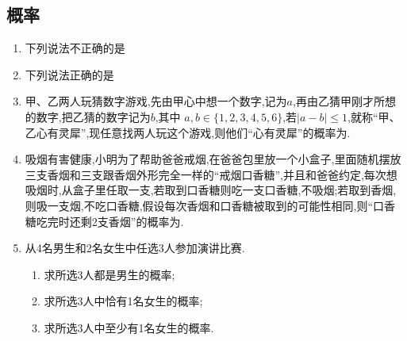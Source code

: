 \subsection*{概率}
\begin{enumerate}
    \item 下列说法不正确的是
    
    \item 下列说法正确的是
    
    \item 甲、乙两人玩猜数字游戏,先由甲心中想一个数字,记为$a$,再由乙猜甲刚才所想的数字,把乙猜的数字记为$b$,其中 $a,b\in\{1,2,3,4,5,6\}$,若$|a-b|\le1$,就称“甲、乙心有灵犀”,现任意找两人玩这个游戏,则他们“心有灵犀”的概率为.
    \item 吸烟有害健康,小明为了帮助爸爸戒烟,在爸爸包里放一个小盒子,里面随机摆放三支香烟和三支跟香烟外形完全一样的“戒烟口香糖”,并且和爸爸约定,每次想吸烟时,从盒子里任取一支,若取到口香糖则吃一支口香糖,不吸烟;若取到香烟,则吸一支烟,不吃口香糖,假设每次香烟和口香糖被取到的可能性相同,则“口香糖吃完时还剩2支香烟”的概率为.
        
    \item 从4名男生和2名女生中任选3人参加演讲比赛.
    \begin{enumerate}
    \item 求所选3人都是男生的概率;
    \item 求所选3人中恰有1名女生的概率;
    \item 求所选3人中至少有1名女生的概率.
    \end{enumerate}
    \begin{jieda}
    \end{jieda}
    

\end{enumerate}
